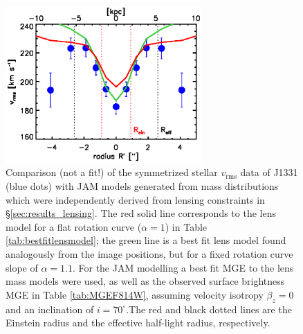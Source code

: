 \begin{figure}
  \centering
  \includegraphics[height=6cm]{fig/lensing_JAM_comparision.ps}
  \caption{Comparison (not a fit!) of the symmetrized stellar $v_\text{rms}$ data of J1331 (blue dots) with JAM models generated from mass distributions which were independently derived from lensing constraints in \S\ref{sec:results_lensing}. The red solid line corresponds to the lens model for a flat rotation curve ($\alpha = 1$) in Table \ref{tab:bestfitlensmodel}; the green line is a best fit lens model found analogously from the image positions, but for a fixed rotation curve slope of $\alpha = 1.1$. For the JAM modelling a best fit MGE to the lens mass models were used, as well as the observed surface brightness MGE in Table \ref{tab:MGEF814W}, assuming velocity isotropy $\beta_z = 0$ and an inclination of $i = 70^\circ$.The red and black dotted lines are the Einstein radius and the effective half-light radius, respectively.}
  \label{fig:JAM_modelL}
\end{figure}



